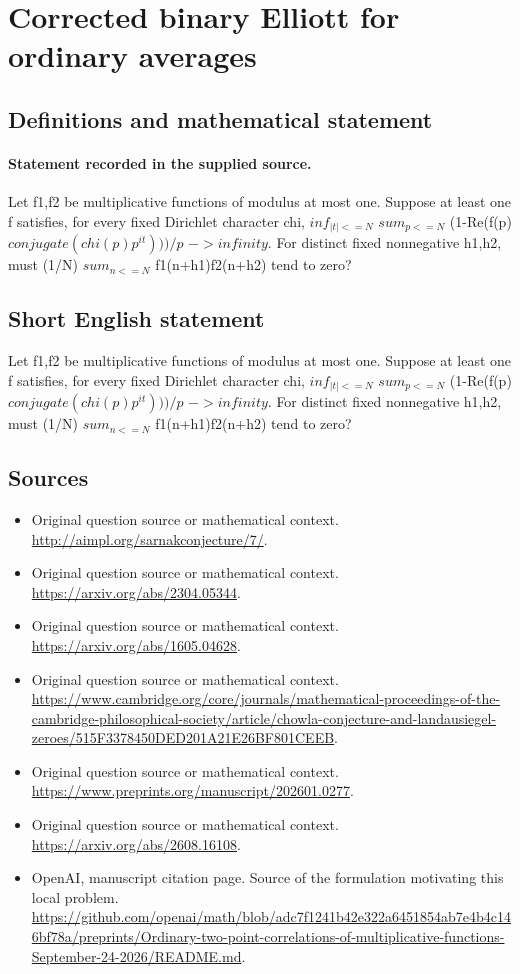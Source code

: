 \documentclass[11pt]{article}
\begin{document}
\section*{Corrected binary Elliott for ordinary averages}\label{statement}
\subsection{Definitions and mathematical statement}
\paragraph{Statement recorded in the supplied source.}
Let f1,f2 be multiplicative functions of modulus at most one. Suppose at least one f satisfies, for every fixed Dirichlet character chi, $inf_{|t|<=N}$ $sum_{p<=N}$ (1-Re(f(p) $conjugate(chi(p)p^{it})))/p$ $->infinity$. For distinct fixed nonnegative h1,h2, must (1/N) $sum_{n<=N}$ f1(n+h1)f2(n+h2) tend to zero?
\subsection{Short English statement}
Let f1,f2 be multiplicative functions of modulus at most one. Suppose at least one f satisfies, for every fixed Dirichlet character chi, $inf_{|t|<=N}$ $sum_{p<=N}$ (1-Re(f(p) $conjugate(chi(p)p^{it})))/p$ $->infinity$. For distinct fixed nonnegative h1,h2, must (1/N) $sum_{n<=N}$ f1(n+h1)f2(n+h2) tend to zero?
\subsection{Sources}
\begin{itemize}
\item[S1] Original question source or mathematical context.
\url{http://aimpl.org/sarnakconjecture/7/}.
\item[S2] Original question source or mathematical context.
\url{https://arxiv.org/abs/2304.05344}.
\item[S3] Original question source or mathematical context.
\url{https://arxiv.org/abs/1605.04628}.
\item[S4] Original question source or mathematical context.
\url{https://www.cambridge.org/core/journals/mathematical-proceedings-of-the-cambridge-philosophical-society/article/chowla-conjecture-and-landausiegel-zeroes/515F3378450DED201A21E26BF801CEEB}.
\item[S5] Original question source or mathematical context.
\url{https://www.preprints.org/manuscript/202601.0277}.
\item[S6] Original question source or mathematical context.
\url{https://arxiv.org/abs/2608.16108}.
\item[S7] OpenAI, manuscript citation page. Source of the formulation motivating this local problem.
\url{https://github.com/openai/math/blob/adc7f1241b42e322a6451854ab7e4b4c146bf78a/preprints/Ordinary-two-point-correlations-of-multiplicative-functions-September-24-2026/README.md}.
\end{itemize}
\end{document}
